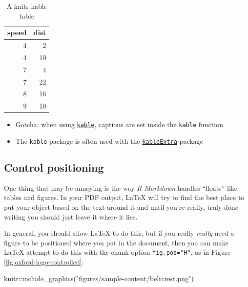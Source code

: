 \documentclass[a4paper, nobind]{templates/ociamthesis}
\providecommand{\tightlist}{%
  \setlength{\itemsep}{0pt}\setlength{\parskip}{0pt}}
\newenvironment{Shaded}{\begin{snugshade}}{\end{snugshade}}
\newcommand{\FunctionTok}[1]{\textcolor[rgb]{0.00,0.00,0.00}{#1}}
\newcommand{\NormalTok}[1]{#1}
\newcommand{\SpecialCharTok}[1]{\textcolor[rgb]{0.00,0.00,0.00}{#1}}
\newcommand{\StringTok}[1]{\textcolor[rgb]{0.31,0.60,0.02}{#1}}
\renewenvironment{Shaded}
{
  \vspace{10pt}%
  \begin{snugshade}%
}{%
  \end{snugshade}%
  \vspace{8pt}%
}
\begin{document}
\begin{table}

\caption{\label{tab:cars-table}A knitr kable table}
\centering
\begin{tabular}[t]{r|r}
\hline
speed & dist\\
\hline
4 & 2\\
\hline
4 & 10\\
\hline
7 & 4\\
\hline
7 & 22\\
\hline
8 & 16\\
\hline
9 & 10\\
\hline
\end{tabular}
\end{table}

\begin{itemize}
\tightlist
\item
  Gotcha: when using \href{https://www.rdocumentation.org/packages/knitr/versions/1.21/topics/kable}{\texttt{kable}}, captions are set inside the \texttt{kable} function
\item
  The \texttt{kable} package is often used with the \href{https://cran.r-project.org/web/packages/kableExtra/vignettes/awesome_table_in_html.html}{\texttt{kableExtra}} package
\end{itemize}

\hypertarget{control-positioning}{%
\subsection{Control positioning}\label{control-positioning}}

One thing that may be annoying is the way \emph{R Markdown} handles ``floats'' like tables and figures.
In your PDF output, LaTeX will try to find the best place to put your object based on the text around it and until you're really, truly done writing you should just leave it where it lies.

In general, you should allow LaTeX to do this, but if you really \emph{really} need a figure to be positioned where you put in the document, then you can make LaTeX attempt to do this with the chunk option \texttt{fig.pos="H"}, as in Figure \ref{fig:oxford-logo-controlled}:

\begin{Shaded}
\begin{Highlighting}[]
\NormalTok{knitr}\SpecialCharTok{::}\FunctionTok{include\_graphics}\NormalTok{(}\StringTok{"figures/sample{-}content/beltcrest.png"}\NormalTok{)}
\end{Highlighting}
\end{Shaded}
\end{document}
